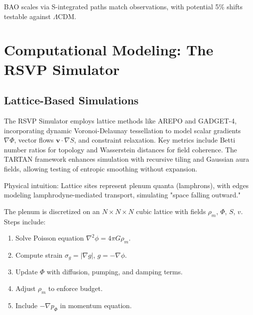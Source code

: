 \documentclass[12pt, a4paper, openany]{book}
\theoremstyle{definition}
\begin{document}
BAO scales via S-integrated paths match observations, with potential 5\% shifts testable against $\Lambda$CDM.

\chapter{Computational Modeling: The RSVP Simulator}
\section{Lattice-Based Simulations}
The RSVP Simulator employs lattice methods like AREPO and GADGET-4, incorporating dynamic Voronoi-Delaunay tessellation to model scalar gradients $\nabla \Phi$, vector flows $\mathbf{v} \cdot \nabla S$, and constraint relaxation. Key metrics include Betti number ratios for topology and Wasserstein distances for field coherence. The TARTAN framework enhances simulation with recursive tiling and Gaussian aura fields, allowing testing of entropic smoothing without expansion.

Physical intuition: Lattice sites represent plenum quanta (lamphrons), with edges modeling lamphrodyne-mediated transport, simulating "space falling outward."

The plenum is discretized on an $N \times N \times N$ cubic lattice with fields $\rho_m$, $\Phi$, $S$, $v$. Steps include:
\begin{enumerate}
    \item Solve Poisson equation $\nabla^2 \phi = 4\pi G \rho_m$.
    \item Compute strain $\sigma_g = | \nabla g |$, $g = - \nabla \phi$.
    \item Update $\Phi$ with diffusion, pumping, and damping terms.
    \item Adjust $\rho_m$ to enforce budget.
    \item Include $- \nabla p_\Phi$ in momentum equation.
\end{enumerate}
\end{document}
